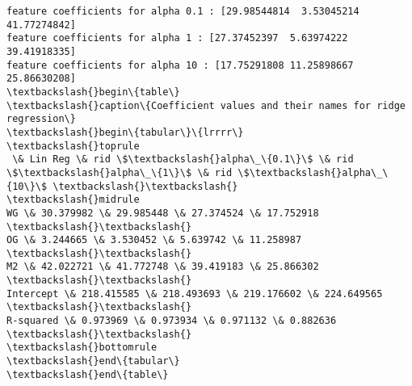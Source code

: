 \documentclass[11pt]{article}
\begin{document}
    \begin{Verbatim}[commandchars=\\\{\}]
feature coefficients for alpha 0.1 : [29.98544814  3.53045214 41.77274842]
feature coefficients for alpha 1 : [27.37452397  5.63974222 39.41918335]
feature coefficients for alpha 10 : [17.75291808 11.25898667 25.86630208]
\textbackslash{}begin\{table\}
\textbackslash{}caption\{Coefficient values and their names for ridge regression\}
\textbackslash{}begin\{tabular\}\{lrrrr\}
\textbackslash{}toprule
 \& Lin Reg \& rid \$\textbackslash{}alpha\_\{0.1\}\$ \& rid \$\textbackslash{}alpha\_\{1\}\$ \& rid \$\textbackslash{}alpha\_\{10\}\$ \textbackslash{}\textbackslash{}
\textbackslash{}midrule
WG \& 30.379982 \& 29.985448 \& 27.374524 \& 17.752918 \textbackslash{}\textbackslash{}
OG \& 3.244665 \& 3.530452 \& 5.639742 \& 11.258987 \textbackslash{}\textbackslash{}
M2 \& 42.022721 \& 41.772748 \& 39.419183 \& 25.866302 \textbackslash{}\textbackslash{}
Intercept \& 218.415585 \& 218.493693 \& 219.176602 \& 224.649565 \textbackslash{}\textbackslash{}
R-squared \& 0.973969 \& 0.973934 \& 0.971132 \& 0.882636 \textbackslash{}\textbackslash{}
\textbackslash{}bottomrule
\textbackslash{}end\{tabular\}
\textbackslash{}end\{table\}

    \end{Verbatim}

    \begin{center}
    \end{center}
    { \hspace*{\fill} \\}
    
\end{document}
